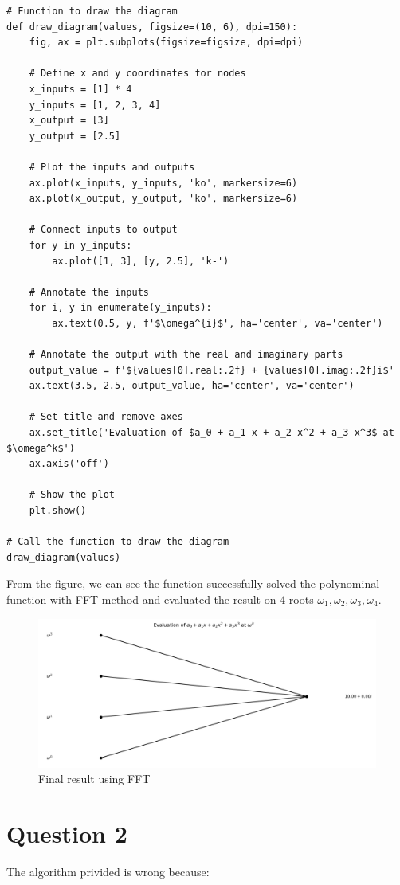 \documentclass{article}
\begin{document}
\begin{verbatim}
# Function to draw the diagram
def draw_diagram(values, figsize=(10, 6), dpi=150):
    fig, ax = plt.subplots(figsize=figsize, dpi=dpi)
    
    # Define x and y coordinates for nodes
    x_inputs = [1] * 4
    y_inputs = [1, 2, 3, 4]
    x_output = [3]
    y_output = [2.5]
    
    # Plot the inputs and outputs
    ax.plot(x_inputs, y_inputs, 'ko', markersize=6)
    ax.plot(x_output, y_output, 'ko', markersize=6)
    
    # Connect inputs to output
    for y in y_inputs:
        ax.plot([1, 3], [y, 2.5], 'k-')

    # Annotate the inputs
    for i, y in enumerate(y_inputs):
        ax.text(0.5, y, f'$\omega^{i}$', ha='center', va='center')

    # Annotate the output with the real and imaginary parts
    output_value = f'${values[0].real:.2f} + {values[0].imag:.2f}i$'
    ax.text(3.5, 2.5, output_value, ha='center', va='center')

    # Set title and remove axes
    ax.set_title('Evaluation of $a_0 + a_1 x + a_2 x^2 + a_3 x^3$ at $\omega^k$')
    ax.axis('off')

    # Show the plot
    plt.show()

# Call the function to draw the diagram
draw_diagram(values)
\end{verbatim}
From the figure, we can see the function successfully solved the polynominal function with FFT method and evaluated the result on 4 roots $\omega_1,\omega_2,\omega_3,\omega_4$.
\begin{figure}[H]
    \centering
    \includegraphics[width=0.75\linewidth]{Screenshot 2024-04-09 at 16.08.00.png}
    \caption{Final result using FFT}
\end{figure}

\section{Question 2}
The algorithm privided is wrong because:
\end{document}
